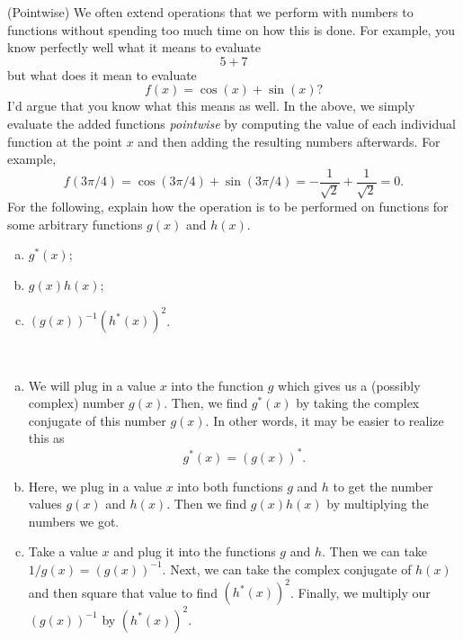 \documentclass[12pt]{article} %
\begin{document}
\newpage
\begin{problem}
	(Pointwise) We often extend operations that we perform with numbers to functions without spending too much time on how this is done. For example, you know perfectly well what it means to evaluate
	\[
		5+7
	\]
	but what does it mean to evaluate
	\[
		f(x)=\cos(x)+\sin(x)?
	\]
	I'd argue that you know what this means as well.  In the above, we simply evaluate the added functions \emph{pointwise} by computing the value of each individual function at the point $x$ and then adding the resulting numbers afterwards. For example,
	\[
		f(3\pi/4)=\cos(3\pi/4) + \sin(3\pi/4)= -\frac{1}{\sqrt{2}}+\frac{1}{\sqrt{2}}=0.
	\]
	For the following, explain how the operation is to be performed on functions for some arbitrary functions $g(x)$ and $h(x)$.
	\begin{enumerate}[(a)]
		\item $g^*(x)$;
		\item $g(x)h(x)$;
		\item $(g(x))^{-1}(h^*(x))^2$.
	\end{enumerate}
\end{problem}
\begin{solution}~
	\begin{enumerate}[(a)]
		\item We will plug in a value $x$ into the function $g$ which gives us a (possibly complex) number $g(x)$. Then, we find $g^*(x)$ by taking the complex conjugate of this number $g(x)$. In other words, it may be easier to realize this as
		\[
		g^*(x)=(g(x))^*.
		\]
		\item Here, we plug in a value $x$ into both functions $g$ and $h$ to get the number values $g(x)$ and $h(x)$. Then we find $g(x)h(x)$ by multiplying the numbers we got.
		\item Take a value $x$ and plug it into the functions $g$ and $h$. Then we can take $1/g(x)=(g(x))^{-1}$. Next, we can take the complex conjugate of $h(x)$ and  then square that value to find $(h^*(x))^2$. Finally, we multiply our $(g(x))^{-1}$ by $(h^*(x))^2$.
		\end{enumerate}
\end{solution}
\end{document}
